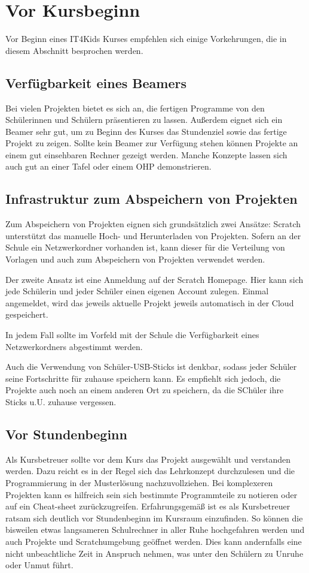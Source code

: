 \section{Vor Kursbeginn}

Vor Beginn eines IT4Kids Kurses empfehlen sich einige Vorkehrungen, die in diesem Abschnitt besprochen werden.

\subsection{Verfügbarkeit eines Beamers}
Bei vielen Projekten bietet es sich an, die fertigen Programme von den Schülerinnen und Schülern präsentieren zu lassen. Außerdem eignet sich ein Beamer sehr gut, um zu Beginn des Kurses das Stundenziel sowie das fertige Projekt zu zeigen. Sollte kein Beamer zur Verfügung stehen können Projekte an einem gut einsehbaren Rechner gezeigt werden. Manche Konzepte lassen sich auch gut an einer Tafel oder einem OHP demonstrieren.

\subsection{Infrastruktur zum Abspeichern von Projekten}
Zum Abspeichern von Projekten eignen sich grundsätzlich zwei Ansätze: Scratch unterstützt das manuelle Hoch- und Herunterladen von Projekten. Sofern an der Schule ein Netzwerkordner vorhanden ist, kann dieser für die Verteilung von Vorlagen und auch zum Abspeichern von Projekten verwendet werden.

Der zweite Ansatz ist eine Anmeldung auf der Scratch Homepage. Hier kann sich jede Schülerin und jeder Schüler einen eigenen Account zulegen. Einmal angemeldet, wird das jeweils aktuelle Projekt jeweils automatisch in der Cloud gespeichert.

In jedem Fall sollte im Vorfeld mit der Schule die Verfügbarkeit eines Netzwerkordners abgestimmt werden.

Auch die Verwendung von Schüler-USB-Sticks ist denkbar, sodass jeder Schüler seine Fortschritte für zuhause speichern kann. Es empfiehlt sich jedoch, die Projekte auch noch an einem anderen Ort zu speichern, da die SChüler ihre Sticks u.U. zuhause vergessen.

\subsection {Vor Stundenbeginn}
Als Kursbetreuer sollte vor dem Kurs das Projekt ausgewählt und verstanden werden. Dazu reicht es in der Regel sich das Lehrkonzept durchzulesen und die Programmierung in der Musterlösung nachzuvollziehen. Bei komplexeren Projekten kann es hilfreich sein sich bestimmte Programmteile zu notieren oder auf ein Cheat-sheet zurückzugreifen.
Erfahrungsgemäß ist es als Kursbetreuer ratsam sich deutlich vor Stundenbeginn im Kursraum einzufinden. So können die bisweilen etwas langsameren Schulrechner in aller Ruhe hochgefahren werden und auch Projekte und Scratchumgebung geöffnet werden. Dies kann andernfalls eine nicht unbeachtliche Zeit in Anspruch nehmen, was unter den Schülern zu Unruhe oder Unmut führt.
